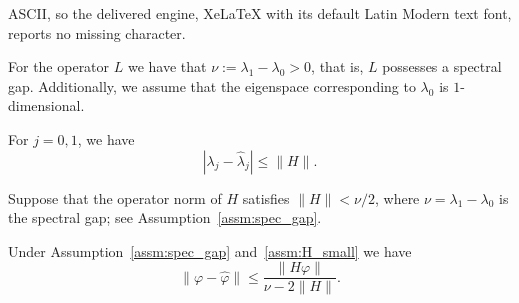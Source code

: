 \documentclass[10pt,a4paper]{amsart}
\begin{document}
ASCII, so the delivered engine, XeLaTeX with its default Latin Modern text font, reports no missing character.
\begin{assumption}
	For the operator $L$ we have that $\nu := \lambda_1-\lambda_0 >0$, that is, $L$ possesses a spectral gap. Additionally, we assume that the eigenspace corresponding to $\lambda_0$ is $1$-dimensional.
    \label{assm:spec_gap}
\end{assumption}

\begin{lemma}
	\label{lemma:wey}
    For $j=0,1$, we have 
    \begin{equation}
        |\lambda_j - \widehat \lambda_j|\le \|H\|.
        \label{eq:eval_bd}
    \end{equation}
\end{lemma}

\begin{assumption}
    Suppose that the operator norm of $ H$ satisfies $\|H\|<\nu/2$, where $\nu = \lambda_1-\lambda_0$ is the spectral gap; see Assumption~\ref{assm:spec_gap}.
    \label{assm:H_small}
\end{assumption}

\begin{theorem}
    Under Assumption~\ref{assm:spec_gap} and~\ref{assm:H_small} we have
    \begin{equation} \label{eq_thm_bnd_case}
        \|\varphi-\widehat \varphi\| 
        \leq \frac{\| H\varphi \|}{\nu-2\|H\|}.
    \end{equation}
    \label{thm:bdd_case}
\end{theorem}
\end{document}
